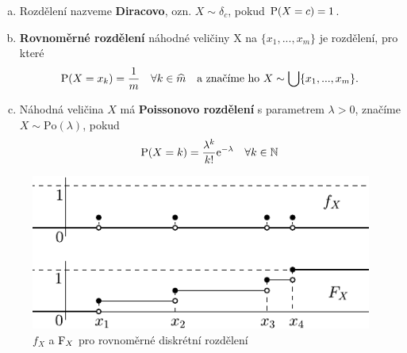\begin{example}
	\begin{enumerate}[a)]
		\item Rozdělení nazveme \textbf{Diracovo}, ozn. $X \sim \delta_c$, pokud $\mathrm{P}(X=c)=1$.
		\item \textbf{Rovnoměrné rozdělení} náhodné veličiny X na $\{ x_1,...,x_m \}$ je rozdělení, pro které
		$$ \mathrm{P}(X=x_k)=\frac{1}{m} ~~~\forall k \in \widehat{m} ~~\text{ a značíme ho }X \sim \bigcup\{ x_1,...,x_m \}.  $$
		\item Náhodná veličina $X$ má \textbf{Poissonovo rozdělení} s parametrem $\lambda>0$, značíme $X\sim \mathrm{Po}(\lambda) $, pokud 
		$$ \mathrm{P}(X=k)=\frac{\lambda^k}{k!}\mathrm{e}^{-\lambda} ~~~\forall k\in\mathbb{N} $$
	\end{enumerate}
\end{example}
\begin{figure}[h]
	\centering
	\includegraphics[width=0.55\linewidth]{rovnomdiskret}
	\caption{$f_X$ a $\mathrm{F}_X$ pro rovnoměrné diskrétní rozdělení}
	\label{fig:rovnomdiskret}
\end{figure}
